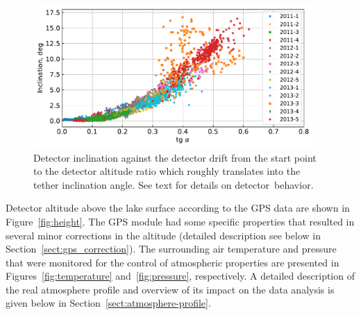 \documentclass[universe,article,accept,moreauthors,pdftex]{Definitions/mdpi}
\begin{document}
 \begin{figure}[H] 
       \includegraphics[width=0.95\textwidth]{tg-inclination.pdf}
       \caption{Detector inclination against the detector drift from the start point to the detector altitude ratio which roughly translates into the tether inclination angle. See text for details on detector~behavior.}
       \label{fig:drift-inclination}
\end{figure}

Detector altitude above the lake surface according to the GPS data are shown in Figure~\ref{fig:height}. The GPS module had some specific properties that resulted in several minor corrections in the altitude (detailed description see below in Section~\ref{sect:gps_correction}). The surrounding air temperature and pressure that were monitored for the control of atmospheric properties are presented in Figures~\ref{fig:temperature} and~\ref{fig:pressure}, respectively. A detailed description of the real atmosphere profile and overview of its impact on the data analysis is given below in Section~\ref{sect:atmosphere-profile}.
\end{document}
